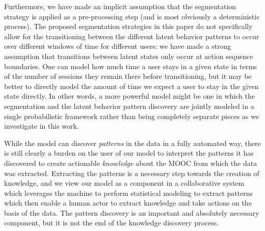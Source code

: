 Furthermore, we have made an implicit assumption that the segmentation
strategy is applied as a pre-processing step (and is most obviously a
deterministic process). The proposed segmentation strategies in this paper
do not specifically allow for the transitioning between the different
latent behavior patterns to occur over different windows of time for
different users: we have made a strong assumption that transitions between
latent states only occur at action sequence boundaries. One can model how
much time a user stays in a given state in terms of the number of sessions
they remain there before transitioning, but it may be better to directly
model the amount of time we expect a user to stay in the given state
directly. In other words, a more powerful model might be one in which the
segmentation and the latent behavior pattern discovery are jointly modeled
in a single probabilistic framework rather than being completely separate
pieces as we investigate in this work.

While the model can discover \emph{patterns} in the data in a fully
automated way, there is still clearly a burden on the user of our model to
interpret the patterns it has discovered to create actionable
\emph{knowledge} about the MOOC from which the data was extracted.
Extracting the patterns is a necessary step towards the creation of
knowledge, and we view our model as a component in a collaborative system
which leverages the machine to perform statistical modeling to extract
patterns which then enable a human actor to extract knowledge and take
actions on the basis of the data. The pattern discovery is an important
and absolutely necessary component, but it is not the end of the knowledge
discovery process.
